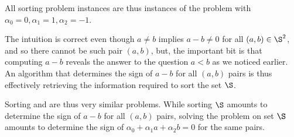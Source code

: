 All sorting problem instances are thus instances of the \twoLDT problem with
$\alpha_0 = 0, \alpha_1 = 1, \alpha_2 = -1$.

The intuition is correct even though $a \neq b$ implies $a-b \neq 0$ for all
$(a,b) \in \S^2$, and so there cannot be such pair $(a,b)$, but, the important
bit is that computing $a-b$ reveals the answer to the question $a<b$ as we
noticed earlier. An algorithm that determines the sign of $a-b$ for all $(a,b)$
pairs is thus effectively retrieving the information required to sort the set
$\S$.

Sorting and \twoLDT are thus very similar problems. While sorting $\S$ amounts
to determine the sign of $a-b$ for all $(a,b)$ pairs, solving the \twoLDT
problem on set $\S$ amounts to determine the sign of $\alpha_0 + \alpha_1 a +
\alpha_2 b = 0$ for the same pairs.
